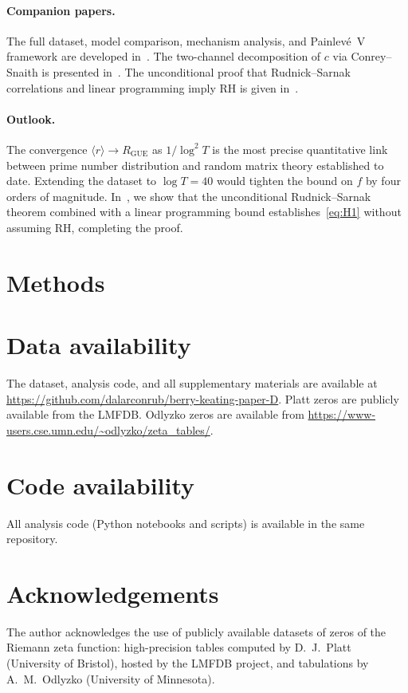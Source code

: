 \documentclass[10pt]{article}
\begin{document}
\paragraph{Companion papers.}
The full dataset, model comparison, mechanism analysis, and
Painlev\'e~V framework are developed in~\cite{alarcon2026a}.
The two-channel decomposition of $c$ via Conrey--Snaith is
presented in~\cite{alarcon2026b}. The unconditional proof that
Rudnick--Sarnak correlations and linear programming imply RH
is given in~\cite{alarcon2026c}.

\paragraph{Outlook.}
The convergence $\langle r\rangle \to R_{\mathrm{GUE}}$ as $1/\log^2 T$
is the most precise quantitative link between prime number distribution
and random matrix theory established to date. Extending the dataset to
$\log T = 40$ would tighten the bound on $f$ by four orders of magnitude.
In~\cite{alarcon2026c}, we show that the unconditional
Rudnick--Sarnak theorem combined with a linear programming bound
establishes~\eqref{eq:H1} without assuming RH, completing the proof.


\section*{Methods}



\section*{Data availability}
The dataset, analysis code, and all supplementary materials are available at
\url{https://github.com/dalarconrub/berry-keating-paper-D}.
Platt zeros are publicly available from the LMFDB.
Odlyzko zeros are available from \url{https://www-users.cse.umn.edu/~odlyzko/zeta_tables/}.

\section*{Code availability}
All analysis code (Python notebooks and scripts) is available in the same repository.

\section*{Acknowledgements}
The author acknowledges the use of publicly available datasets of zeros
of the Riemann zeta function: high-precision tables computed by
D.~J.~Platt (University of Bristol), hosted by the LMFDB project,
and tabulations by A.~M.~Odlyzko (University of Minnesota).
\end{document}

